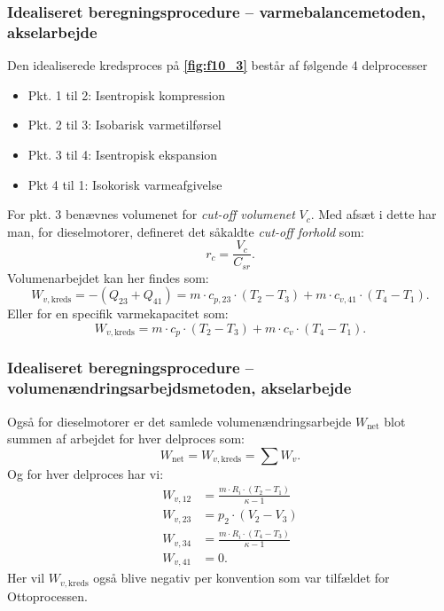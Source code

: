 \subsubsection{Idealiseret beregningsprocedure -- varmebalancemetoden, akselarbejde}
Den idealiserede kredsproces på \textbf{\autoref{fig:f10_3}} består af følgende 4 delprocesser
\begin{itemize}
  \item Pkt. 1 til 2: Isentropisk kompression
  \item Pkt. 2 til 3: Isobarisk varmetilførsel
  \item Pkt. 3 til 4: Isentropisk ekspansion
  \item Pkt 4 til 1: Isokorisk varmeafgivelse
\end{itemize}

For pkt. 3 benævnes volumenet for \textit{cut-off volumenet} $V_c$. Med afsæt i dette har man, for dieselmotorer, defineret det såkaldte \textit{cut-off forhold} som:
\[ 
r_c = \frac{V_c}{C_{s r}}
.\]
Volumenarbejdet kan her findes som:
\[ 
W_{v, \mathrm{kreds}} = -\left( Q_{23} + Q_{41} \right) = m \cdot c_{p,23} \cdot \left( T_2 - T_3 \right) + m \cdot c_{v, 41} \cdot \left( T_4 - T_1 \right) 
.\]
Eller for en specifik varmekapacitet som:
\[ 
W_{v, \mathrm{kreds}} = m \cdot c_{p} \cdot \left( T_2 - T_3 \right) + m \cdot c_v \cdot \left( T_4 - T_1 \right) 
.\]

\subsubsection{Idealiseret beregningsprocedure -- volumenændringsarbejdsmetoden, akselarbejde}
Også for dieselmotorer er det samlede volumenændringsarbejde $W_{\mathrm{net}}$ blot summen af arbejdet for hver delproces som:
\[ 
W_{\mathrm{net}} = W_{v, \mathrm{kreds}} = \sum W_{v}
.\]
Og for hver delproces har vi:
\begin{align*}
  W_{v, 12} &= \frac{m\cdot R_i \cdot \left( T_2 - T_1 \right) }{\kappa - 1} \\
  W_{v, 23} &= p_2 \cdot \left( V_2 - V_3 \right)  \\
  W_{v, 34} &= \frac{m \cdot R_i \cdot \left( T_4 - T_3 \right) }{\kappa - 1} \\
  W_{v, 41} &= 0
.\end{align*}
Her vil $W_{v, \mathrm{kreds}}$ også blive negativ per konvention som var tilfældet for Ottoprocessen. 

